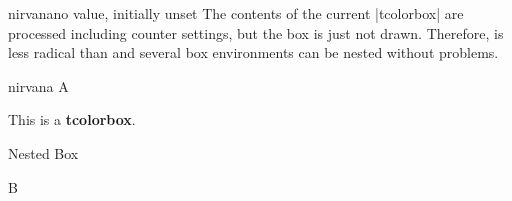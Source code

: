 \begin{docTcbKey}[][doc new=2019-03-01]{nirvana}{}{no value, initially unset}
  The contents of the current |tcolorbox| are processed including counter
  settings, but the box is just not drawn.
  Therefore,  is less radical than 
  and several box environments can be nested without problems.

\begin{exdispExample}{nirvana}
A%
  \begin{tcolorbox}[
      title=This box is completely removed by the following key,
      nirvana
    ]
  This is a \textbf{tcolorbox}.
    \begin{tcolorbox}
    Nested Box
    \end{tcolorbox}
  \end{tcolorbox}%
B
\end{exdispExample}
\end{docTcbKey}
